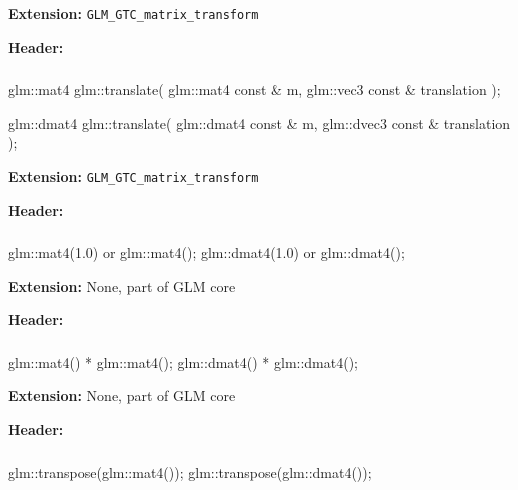 \documentclass{scrartcl}
\numberwithin{figure}{subsection}
\begin{document}
\textbf{Extension:} \verb|GLM_GTC_matrix_transform|

\textbf{Header:} 

\subsubsection{}

\begin{cppcode}
glm::mat4 glm::translate(
  glm::mat4 const & m,
  glm::vec3 const & translation
);

glm::dmat4 glm::translate(
  glm::dmat4 const & m,
  glm::dvec3 const & translation
);
\end{cppcode}

\textbf{Extension:} \verb|GLM_GTC_matrix_transform|

\textbf{Header:} 

\subsubsection{}

\begin{cppcode}
glm::mat4(1.0) or glm::mat4();
glm::dmat4(1.0) or glm::dmat4();
\end{cppcode}

\textbf{Extension:} None, part of GLM core

\textbf{Header:} 

\subsubsection{}

\begin{cppcode}
glm::mat4() * glm::mat4();
glm::dmat4() * glm::dmat4();
\end{cppcode}

\textbf{Extension:} None, part of GLM core

\textbf{Header:} 

\subsubsection{}

\begin{cppcode}
glm::transpose(glm::mat4());
glm::transpose(glm::dmat4());
\end{cppcode}
\end{document}
